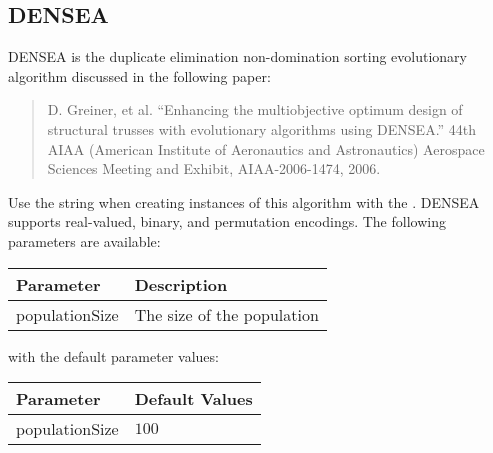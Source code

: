 \subsection{DENSEA}
DENSEA is the duplicate elimination non-domination sorting evolutionary algorithm discussed in the following paper:
\begin{quote}
D. Greiner, et al.  ``Enhancing the multiobjective optimum design of structural trusses with evolutionary algorithms using DENSEA.''  44th AIAA (American Institute of Aeronautics and Astronautics) Aerospace Sciences Meeting and Exhibit, AIAA-2006-1474, 2006.
\end{quote}
Use the string  when creating instances of this algorithm with the .  DENSEA supports real-valued, binary, and permutation encodings.  The following parameters are available:
\newline
\newline
\begin{tabularx}{\linewidth}{lX}
  \hline
  Parameter & Description \\
  \hline
  populationSize & The size of the population \\
  \hline
\end{tabularx}
\newline
\newline
with the default parameter values:
\newline
\newline
\begin{tabularx}{\linewidth}{lX}
  \hline
  Parameter & Default Values \\
  \hline
  populationSize & $100$ \\
  \hline
\end{tabularx}

